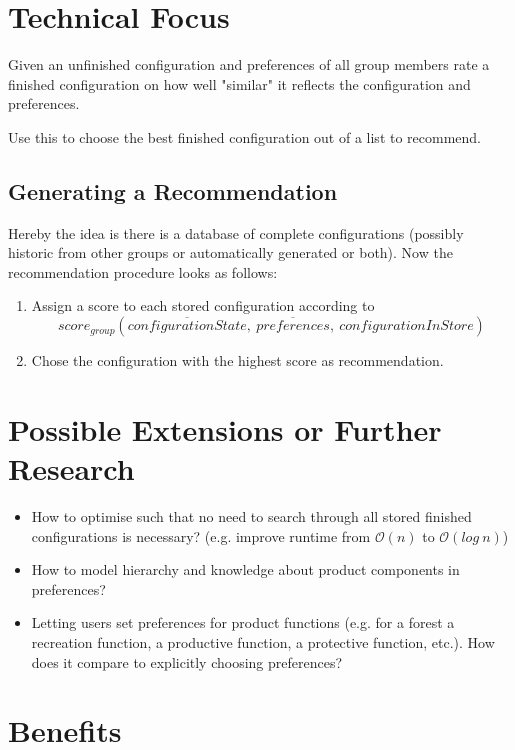\documentclass{article}
\begin{document}
\section{Technical Focus}

Given an unfinished configuration and preferences of all group members rate a finished configuration on how well "similar" it reflects the configuration and preferences.

Use this to choose the best finished configuration out of a list to recommend.

\subsection{Generating a Recommendation}

Hereby the idea is there is a database of complete configurations (possibly historic from other groups or automatically generated or both).
Now the recommendation procedure looks as follows:

\begin{enumerate}
    \item Assign a score to each stored configuration according to $$score_{group}(\overline{configurationState},\ \overline{preferences}, \ configurationInStore)$$
    \item Chose the configuration with the highest score as recommendation.
\end{enumerate}


\section{Possible Extensions or Further Research}

\begin{itemize}
    \item How to optimise such that no need to search through all stored finished configurations is necessary? (e.g. improve runtime from $\mathcal{O}(n)$ to $\mathcal{O}(log\ n)$)
    \item How to model hierarchy and knowledge about product components in preferences?
    \item Letting users set preferences for product functions (e.g. for a forest a recreation function, a productive function, a protective function, etc.). How does it compare to explicitly choosing preferences?
\end{itemize}

\section{Benefits}
\end{document}
